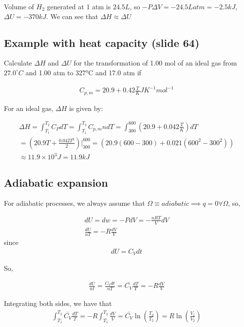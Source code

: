 \documentclass[12pt]{article}
\begin{document}
Volume of $H_2$ generated at 1 atm is $24.5L$, so $-P\Delta V=-24.5Latm=-2.5kJ$, $\Delta U=-370kJ$. We can see that $\Delta H\approx\Delta U$


\subsection*{Example with heat capacity (slide 64)}
Calculate $\Delta H$ and $\Delta U$ for the transformation of 1.00 mol of an ideal gas from $27.0^{\circ}C$
and 1.00 atm to 327°C and 17.0 atm if

\begin{align*}
    C_{p,m}=20.9+0.42\frac{T}{K} JK^{-1}mol^{-1}
\end{align*}

For an ideal gas, $\Delta H$ is given by:

\begin{align*}
    \Delta H=\int_{T_1}^{T_2}C_P dT=\int_{T_1}^{T_2}C_{p,m}ndT=\int_{300}^{600}(20.9+0.042\frac{T}{K})dT\\=(20.9T+\frac{0.042T^2}{2})\vert_{300}^{600}=(20.9(600-300)+0.021(600^2-300^2))\\
    \approx 11.9\times 10^3J=11.9kJ
\end{align*}

\subsection*{Adiabatic expansion}
For adiabatic processes, we always assume that $\Omega\equiv adiabatic\implies q=0\forall\Omega$, so,

\begin{align*}
    dU=dw=-PdV=-\frac{nRT}{V}dV\\
    \frac{dU}{nT}=-R\frac{dV}{V}
\end{align*}
since
\begin{align*}
    dU=C_V dt
\end{align*}

So,

\begin{align*}
    \frac{dU}{nt}=\frac{C_V dt}{nT}=\bar{C_V}\frac{dT}{T}=-R\frac{dV}{V}
\end{align*}

Integrating both sides, we have that
\begin{align*}
    \int_{T_1}^{T_2}\bar{C_V}\frac{dT}{T}=-R\int_{T_1}^{T_2}\frac{dV}{V}=\bar{C_V}\ln(\frac{T_2}{T_2})=R\ln(\frac{V_1}{V_2})
\end{align*}
\end{document}
